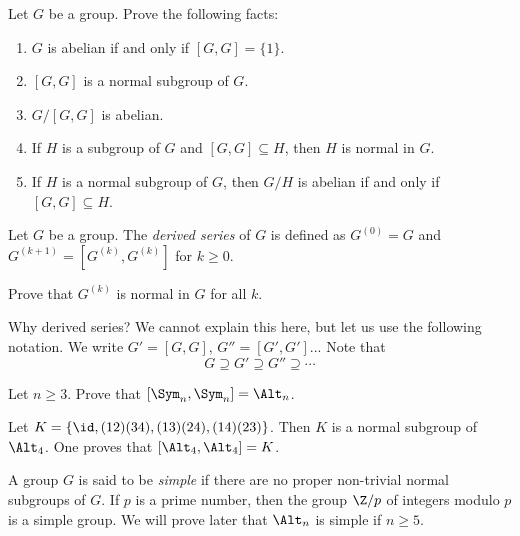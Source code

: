 \begin{exercise}
    Let $G$ be a group. 
    Prove the following facts:
    \begin{enumerate}
        \item $G$ is abelian if and only if $[G,G]=\{1\}$.
        \item $[G,G]$ is a normal subgroup of $G$. 
        \item $G/[G,G]$ is abelian. 
        \item If $H$ is a subgroup of $G$ and $[G,G]\subseteq H$, then 
        $H$ is normal in $G$.
        \item If $H$ is a normal subgroup of $G$, then 
        $G/H$ is abelian if and only if $[G,G]\subseteq H$. 
    \end{enumerate}
\end{exercise}

\begin{definition}
    Let $G$ be a group. The \emph{derived series} of $G$ 
    is defined as $G^{(0)}=G$ and
    $G^{(k+1)}=[G^{(k)},G^{(k)}]$ for $k\geq 0$. 
\end{definition}

\begin{exercise}
    Prove that $G^{(k)}$ is normal in $G$ for all $k$. 
\end{exercise}

Why derived series? We cannot explain this here, but let us use the following
notation. 
We write $G'=[G,G]$, $G''=[G',G']$... 
Note that 
\[
G\supseteq G'\supseteq G''\supseteq\cdots
\]


\begin{exercise}
    Let $n\geq3$. Prove that 
    $[\Sym_n,\Sym_n]=\Alt_n$. 
\end{exercise}

\begin{example}
    Let $K=\{\id,(12)(34),(13)(24),(14)(23)\}$. Then 
    $K$ is a normal subgroup of $\Alt_4$. 
    One proves that $[\Alt_4,\Alt_4]=K$. 
\end{example}

A group $G$ is said to be \emph{simple} 
if there are no proper non-trivial normal subgroups of $G$. If $p$
is a prime number, then the group 
$\Z/p$ of integers modulo $p$ 
is a simple group. We will prove
later that $\Alt_n$ is simple if 
$n\geq5$. 

